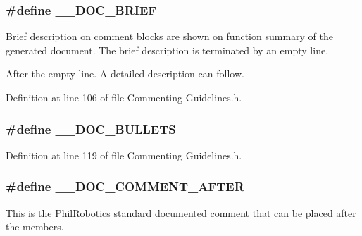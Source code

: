 \subsubsection[{\-\_\-\-\_\-\-D\-O\-C\-\_\-\-B\-R\-I\-E\-F}]{\setlength{\rightskip}{0pt plus 5cm}\#define \-\_\-\-\_\-\-D\-O\-C\-\_\-\-B\-R\-I\-E\-F}\label{_commenting_01_guidelines_8h_a5d32347608032efb5f94f60964dc39fc}


Brief description on comment blocks are shown on function summary of the generated document. The brief description is terminated by an empty line. 

After the empty line. A detailed description can follow. 

Definition at line 106 of file Commenting Guidelines.\-h.

\subsubsection[{\-\_\-\-\_\-\-D\-O\-C\-\_\-\-B\-U\-L\-L\-E\-T\-S}]{\setlength{\rightskip}{0pt plus 5cm}\#define \-\_\-\-\_\-\-D\-O\-C\-\_\-\-B\-U\-L\-L\-E\-T\-S}\label{_commenting_01_guidelines_8h_ac89283ca91abe3a2207ab2cd854b99fb}


Definition at line 119 of file Commenting Guidelines.\-h.

\subsubsection[{\-\_\-\-\_\-\-D\-O\-C\-\_\-\-C\-O\-M\-M\-E\-N\-T\-\_\-\-A\-F\-T\-E\-R}]{\setlength{\rightskip}{0pt plus 5cm}\#define \-\_\-\-\_\-\-D\-O\-C\-\_\-\-C\-O\-M\-M\-E\-N\-T\-\_\-\-A\-F\-T\-E\-R}\label{_commenting_01_guidelines_8h_a05481f633e29eef515b0444498677613}


This is the Phil\-Robotics standard documented comment that can be placed after the members. 



